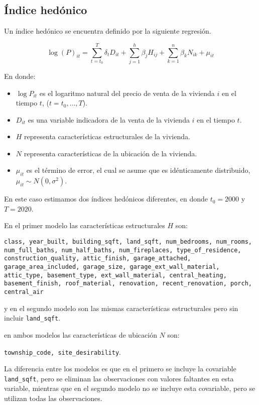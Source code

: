\documentclass[conference]{IEEEtran}
\begin{document}
\subsection{Índice hedónico}

Un índice hedónico se encuentra definido por la siguiente regresión.

\[ \log(P)_{it} = \sum_{t=t_0}^{T} \delta_t D_{it} + \sum_{j=1}^h \beta_j H_{ij} + \sum_{k=1}^n \beta_k N_{ik} + \mu_{it} \]

En donde:

\begin{itemize}
  \item $\log{P}_{it}$ es el logaritmo natural del precio de venta de la vivienda $i$ en el tiempo $t$, ($t = t_0, \ldots, T$).
  \item $D_{it}$ es una variable indicadora de la venta de la vivienda $i$ en el tiempo $t$.
  \item $H$ representa características estructurales de la vivienda.
  \item $N$ representa características de la ubicación de la vivienda.
  \item $\mu_{it}$ es el término de error, el cual se asume que es idénticamente distribuido, $\mu_{it} \sim N(0, \sigma^2)$.
\end{itemize}

En este caso estimamos dos índices hedónicos diferentes, en donde $t_0 = 2000$ y $T = 2020$. 

En el primer modelo las características estructurales $H$ son:

\texttt{class, year\_built, building\_sqft, land\_sqft, num\_bedrooms, num\_rooms, num\_full\_baths, num\_half\_baths, num\_fireplaces,
type\_of\_residence, construction\_quality, attic\_finish, garage\_attached, garage\_area\_included, garage\_size, garage\_ext\_wall\_material, attic\_type, basement\_type, ext\_wall\_material, central\_heating, basement\_finish, roof\_material, renovation, recent\_renovation, porch, central\_air}

y en el segundo modelo son las mismas características estructurales pero sin incluir \texttt{land\_sqft}.

en ambos modelos las características de ubicación $N$ son:

\texttt{township\_code, site\_desirability}. 

La diferencia entre los modelos es que en el primero se incluye la covariable 
\texttt{land\_sqft}, pero se eliminan las observaciones con valores faltantes en esta variable,
mientras que en el segundo modelo no se incluye esta covariable, pero se utilizan todas las observaciones.
\end{document}
